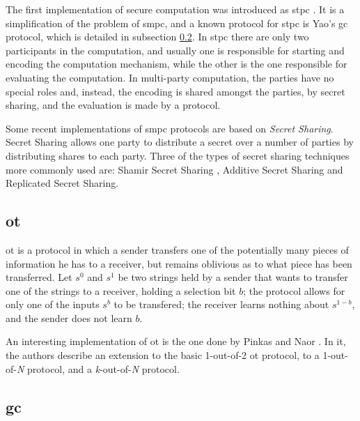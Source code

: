The first implementation of secure computation was introduced as \ac{stpc} \cite{yao1982protocols}. It is a simplification of the problem of \ac{smpc}, and a known protocol for \ac{stpc} is Yao's \ac{gc} protocol, which is detailed in subsection \ref{ssec:GarbledCircuits}. In \ac{stpc} there are only two participants in the computation, and usually one is responsible for starting and encoding the computation mechanism, while the other is the one responsible for evaluating the computation. In multi-party computation, the parties have no special roles and, instead, the encoding is shared amongst the parties, by secret sharing, and the evaluation is made by a protocol.

Some recent implementations of \ac{smpc} protocols are based on \textit{Secret Sharing}. Secret Sharing allows one party to distribute a secret over a number of parties by distributing shares to each party. Three of the types of secret sharing techniques more commonly used are: Shamir Secret Sharing \cite{shamir1979share}, Additive Secret Sharing and Replicated Secret Sharing.






\subsection{\acl{ot}}
\label{ssec:ObliviousTransfer}


\acf{ot} \cite{rabin2005exchange} is a protocol in which a sender transfers one of the potentially many pieces of information he has to a receiver, but remains oblivious as to what piece has been transferred. Let $s^0$ and $s^1$ be two strings held by a sender that wants to transfer one of the strings to a receiver, holding a selection bit $b$; the protocol allows for only one of the inputs $s^b$ to be transfered; the receiver learns nothing about $s^{1-b}$, and the sender does not learn $b$. 

An interesting implementation of \ac{ot} is the one done by Pinkas and Naor \cite{naor2005computationally}. In it, the authors describe an extension to the basic 1-out-of-2 \ac{ot} protocol, to a 1-out-of-\textit{N} protocol, and a \textit{k}-out-of-\textit{N} protocol.


\subsection{\acl{gc}} 
\label{ssec:GarbledCircuits}


